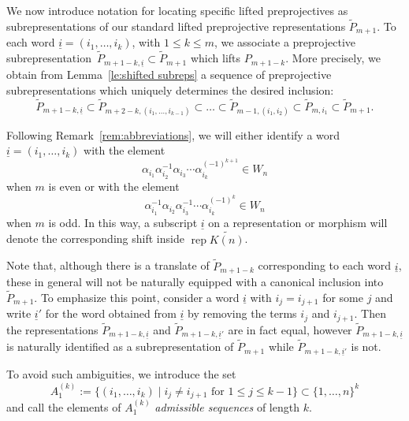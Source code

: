 \documentclass[smallextended,envcountsect,envcountsame]{svjour3}
\numberwithin{equation}{section}
\newcommand{\ui}{{\underline i}}
\newcommand{\rep}{\operatorname{rep}}
\begin{document}
We now introduce notation for locating specific lifted preprojectives as subrepresentations of our standard lifted preprojective representations $\tilde P_{m+1}$.
To each word $\ui=(i_1,\ldots,i_k)$, with $1\leq k\leq m$, we associate a preprojective subrepresentation~$\tilde P_{m+1-k,\ui}\subset\tilde P_{m+1}$ which lifts $P_{m+1-k}$.
More precisely, we obtain from Lemma~\ref{le:shifted subreps} a sequence of preprojective subrepresentations which uniquely determines the desired inclusion:
\[\tilde P_{m+1-k,\ui}\subset\tilde P_{m+2-k,(i_1,\ldots,i_{k-1})}\subset\ldots\subset\tilde P_{m-1,(i_1,i_2)}\subset\tilde P_{m,i_1}\subset\tilde P_{m+1}.\]
\begin{remark}
  Following Remark~\ref{rem:abbreviations}, we will either identify a word~$\ui=(i_1,\ldots,i_k)$ with the element 
  \[\alpha_{i_1}\alpha_{i_2}^{-1}\alpha_{i_3}\cdots\alpha_{i_k}^{(-1)^{k+1}}\in W_n\]
  when $m$ is even or with the element 
  \[\alpha_{i_1}^{-1}\alpha_{i_2}\alpha_{i_3}^{-1}\cdots\alpha_{i_k}^{(-1)^k}\in W_n\]
  when $m$ is odd.
  In this way, a subscript $\ui$ on a representation or morphism will denote the corresponding shift inside $\rep\widetilde{K(n)}$.
\end{remark}

Note that, although there is a translate of $\tilde P_{m+1-k}$ corresponding to each word $\ui$, these in general will not be naturally equipped with a canonical inclusion into $\tilde P_{m+1}$.
To emphasize this point, consider a word $\ui$ with $i_j=i_{j+1}$ for some $j$ and write $\ui'$ for the word obtained from $\ui$ by removing the terms $i_j$ and $i_{j+1}$.
Then the representations $\tilde P_{m+1-k,\ui}$ and $\tilde P_{m+1-k,\ui'}$ are in fact equal, however $\tilde P_{m+1-k,\ui}$ is naturally identified as a subrepresentation of $\tilde P_{m+1}$ while $\tilde P_{m+1-k,\ui'}$ is not.

To avoid such ambiguities, we introduce the set
\[A_1^{(k)}:=\{(i_1,\ldots,i_k)\mid i_j\ne i_{j+1}\text{ for $1\le j\le k-1$}\}\subset\{1,\ldots,n\}^k\]
and call the elements of $A_1^{(k)}$ \emph{admissible sequences} of length $k$.
\end{document}
